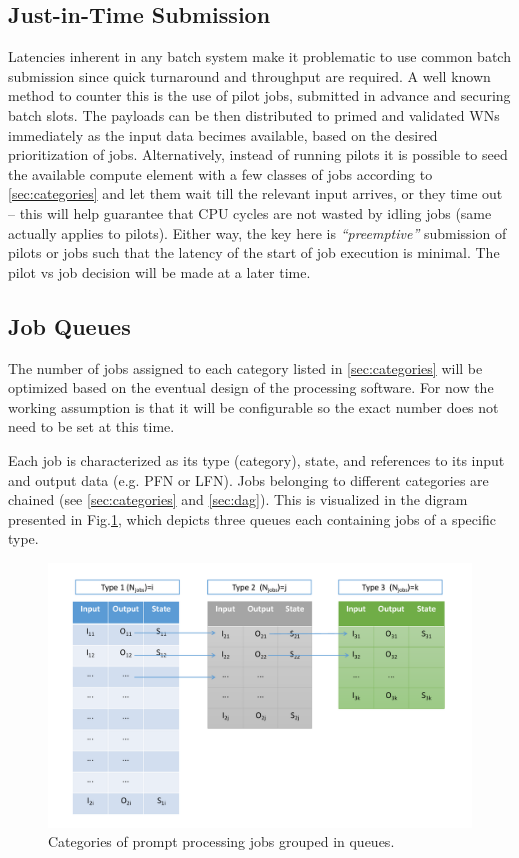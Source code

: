 \documentclass[pdftex,12pt,letter]{article}
\begin{document}
\subsection{Just-in-Time Submission}
\label{sec:justintime}
Latencies inherent in any batch system make it problematic to use common batch submission since
quick turnaround and throughput are required. A well known method to counter this is the use
of pilot jobs, submitted in advance and securing batch slots. The payloads can be then distributed
to primed and validated WNs immediately as the input data becimes available, based on the
desired prioritization of jobs. Alternatively, instead of running pilots it is possible to seed
the available compute element with a few classes of jobs according to \ref{sec:categories} and
let them wait till the relevant input arrives, or they time out -- this will help guarantee that
CPU cycles are not wasted by idling jobs (same actually applies to pilots). Either way, the key
here is \textit{``preemptive''} submission of pilots or jobs such that the latency of the start of job
execution is minimal. The pilot vs job decision will be made at a later time.

\subsection{Job Queues}
The number of jobs assigned to each category listed in \ref{sec:categories} will be optimized based
on the eventual design of the processing software. For now the working assumption is that it will
be configurable so the exact number does not need to be set at this time.

Each job is characterized as its type (category), state, and references to its input and output data
(e.g. PFN or LFN). Jobs belonging to different categories are chained (see \ref{sec:categories} and \ref{sec:dag}). This is
visualized in the digram presented in Fig.\ref{fig:queues1}, which depicts three queues each containing
jobs of a specific type.

\begin{figure}[tbh]
  \centering
  \includegraphics[width=1.0\textwidth]{figures/prompt_queues_1.pdf}
  \caption{Categories of prompt processing jobs grouped in queues.}
  \label{fig:queues1}
\end{figure}
\end{document}
